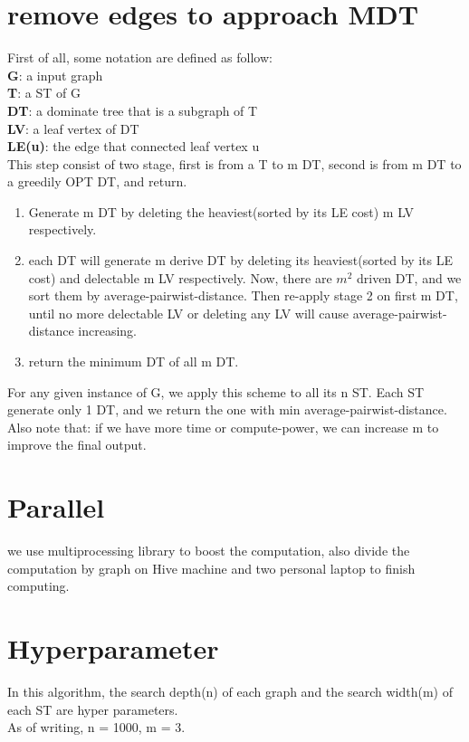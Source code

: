 \documentclass[12pt, a4paper]{article}
\begin{document}
\section*{remove edges to approach MDT}
First of all, some notation are defined as follow:\\
\hspace*{1cm}\textbf{G}: a input graph\\
\hspace*{1cm}\textbf{T}: a ST of G\\
\hspace*{1cm}\textbf{DT}: a dominate tree that is a subgraph of T\\
\hspace*{1cm}\textbf{LV}: a leaf vertex of DT\\
\hspace*{1cm}\textbf{LE(u)}: the edge that connected leaf vertex u\\
This step consist of two stage, first is from a T to m DT, second is from m DT to a greedily OPT DT, and return.
\begin{enumerate}
    \item Generate m DT by deleting the heaviest(sorted by its LE cost) m LV respectively.
    \item each DT will generate m derive DT by deleting its heaviest(sorted by its LE cost) and delectable m LV respectively. 
    Now, there are $m^2$ driven DT, and we sort them by average-pairwist-distance.
    Then re-apply stage 2 on first m DT, until no more delectable LV or deleting any LV will cause average-pairwist-distance increasing.
    \item return the minimum DT of all m DT.
\end{enumerate}
For any given instance of G, we apply this scheme to all its n ST. Each ST generate only 1 DT, and we return the one with min average-pairwist-distance.\\
Also note that: if we have more time or compute-power, we can increase m to improve the final output.


\section*{Parallel}
we use multiprocessing library to boost the computation, also divide the computation by graph on Hive machine and two personal laptop to finish computing.

\section*{Hyperparameter}
In this algorithm, the search depth(n) of each graph and the search width(m) of each ST are hyper parameters.\\
As of writing, n = 1000, m = 3.
\end{document}
